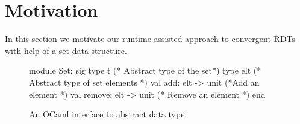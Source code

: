 \section{Motivation}
\label{sec:motivation}


In this section we motivate our runtime-assisted approach to
convergent RDTs with help of a set data structure.

\begin{figure}[ht]
\centering
\begin{ocaml}
module Set: sig
  type t (* Abstract type of the set*)    
  type elt (* Abstract type of set elements *)
  val add: elt -> unit (*Add an element *)
  val remove: elt -> unit (* Remove an element *)
end
\end{ocaml}
\caption{An OCaml interface to  abstract data type.}
\label{fig:ocaml-set}
\end{figure}


